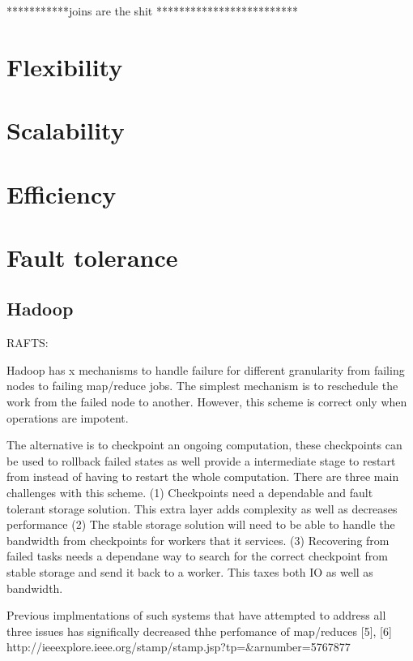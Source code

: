 \documentclass[10pt,twocolumn]{IEEEtran11}
\begin{document}
***********joins are the shit *************************


\section{Flexibility}
 
\section{Scalability}

\section{Efficiency}

\section{Fault tolerance}
































\subsection{Hadoop}
RAFTS:

    Hadoop has x mechanisms to handle failure for different granularity from failing nodes to failing map/reduce jobs.
The simplest mechanism is to reschedule the work from the failed node to another.  However, this scheme is correct only when operations are impotent.  
\par
The alternative is to checkpoint an ongoing computation, these checkpoints can be used to rollback failed states as well provide a intermediate stage to restart from instead of having to restart the whole computation.  There are three main challenges with this scheme.
(1) Checkpoints need a dependable and fault tolerant storage solution.  This extra layer adds complexity as well as decreases performance
(2) The stable storage solution will need to be able to handle the bandwidth from checkpoints for workers that it services.
(3) Recovering from failed tasks needs a dependane way to search for the correct checkpoint from stable storage and
send it back to a worker.  This taxes both IO as well as bandwidth.
\par
Previous implmentations of such systems that have attempted to address all three issues has significally decreased thhe perfomance of map/reduces [5], [6] http://ieeexplore.ieee.org/stamp/stamp.jsp?tp=&arnumber=5767877
\end{document}
